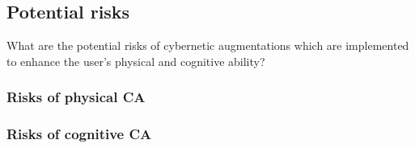 \subsection{Potential risks}
What are the potential risks of cybernetic augmentations which are implemented to enhance the user's physical and cognitive ability?

\subsubsection{Risks of physical CA}


\subsubsection{Risks of cognitive CA}
